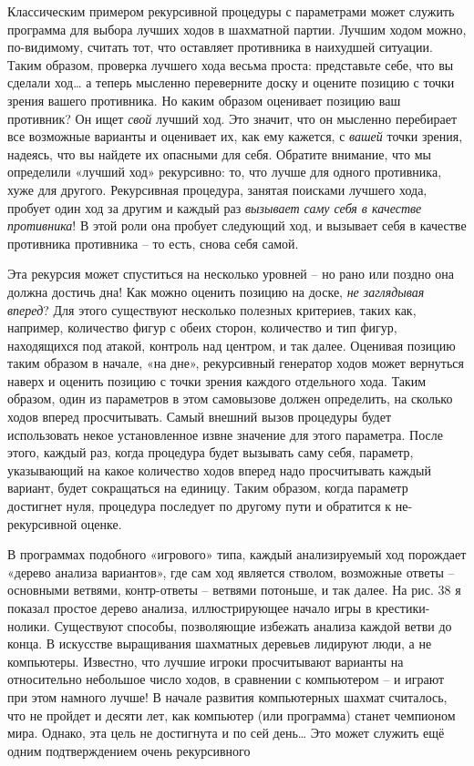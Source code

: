 \documentclass[../main.tex]{subfiles}
\begin{document}
Классическим примером рекурсивной процедуры с параметрами может служить программа для выбора лучших ходов в шахматной партии. Лучшим ходом можно, по-видимому, считать тот, что оставляет противника в наихудшей ситуации. Таким образом, проверка лучшего хода весьма проста: представьте себе, что вы сделали ход\ldots{} а теперь мысленно переверните доску и оцените позицию с точки зрения вашего противника. Но каким образом оценивает позицию ваш противник? Он ищет \emph{свой} лучший ход. Это значит, что он мысленно перебирает все возможные варианты и оценивает их, как ему кажется, с \emph{вашей} точки зрения, надеясь, что вы найдете их опасными для себя. Обратите внимание, что мы определили «лучший ход» рекурсивно: то, что лучше для одного противника, хуже для другого. Рекурсивная процедура, занятая поисками лучшего хода, пробует один ход за другим и каждый раз \emph{вызывает саму себя в качестве противника}! В этой роли она пробует следующий ход, и вызывает себя в качестве противника противника \--- то есть, снова себя самой.

Эта рекурсия может спуститься на несколько уровней \--- но рано или поздно она должна достичь дна! Как можно оценить позицию на доске, \emph{не заглядывая вперед}? Для этого существуют несколько полезных критериев, таких как, например, количество фигур с обеих сторон, количество и тип фигур, находящихся под атакой, контроль над центром, и так далее. Оценивая позицию таким образом в начале, «на дне», рекурсивный генератор ходов может вернуться наверх и оценить позицию с точки зрения каждого отдельного хода. Таким образом, один из параметров в этом самовызове должен определить, на сколько ходов вперед просчитывать. Самый внешний вызов процедуры будет использовать некое установленное извне значение для этого параметра. После этого, каждый раз, когда процедура будет вызывать саму себя, параметр, указывающий на какое количество ходов вперед надо просчитывать каждый вариант, будет сокращаться на единицу. Таким образом, когда параметр достигнет нуля, процедура последует по другому пути и обратится к не-рекурсивной оценке.

В программах подобного «игрового» типа, каждый анализируемый ход порождает «дерево анализа вариантов», где сам ход является стволом, возможные ответы \--- основными ветвями, контр-ответы \--- ветвями потоньше, и так далее. На рис. 38 я показал простое дерево анализа, иллюстрирующее начало игры в крестики-нолики. Существуют способы, позволяющие избежать анализа каждой ветви до конца. В искусстве выращивания шахматных деревьев лидируют люди, а не компьютеры. Известно, что лучшие игроки просчитывают варианты на относительно небольшое число ходов, в сравнении с компьютером \--- и играют при этом намного лучше! В начале развития компьютерных шахмат считалось, что не пройдет и десяти лет, как компьютер (или программа) станет чемпионом мира. Однако, эта цель не достигнута и по сей день\ldots{} Это может служить ещё одним подтверждением очень рекурсивного
\end{document}
